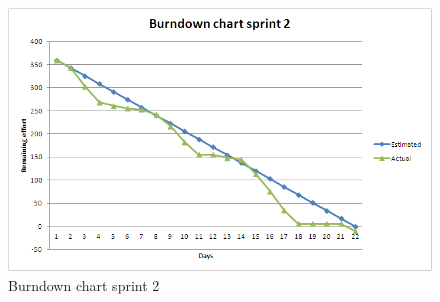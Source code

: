 \begin{figure}
	\includegraphics[width=\textwidth]{burndown2.png}
	\caption{Burndown chart sprint 2}
	\label{fig:burndown2}
\end{figure}